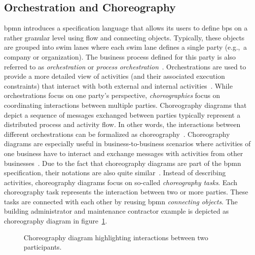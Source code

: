 \subsection{Orchestration and Choreography}
\gls{bpmn} introduces a specification language that allows its users to define \glspl{bp} on a rather granular level using flow and connecting objects. Typically, these objects are grouped into swim lanes where each swim lane defines a single party (e.g.,\ a company or organization). The business process defined for this party is also referred to as \textit{orchestration} or \textit{process orchestration}~\cite{bpmn_v2_spec}. Orchestrations are used to provide a more detailed view of activities (and their associated execution constraints) that interact with both external and internal activities~\cite{orchestration_and_choreography,weske2012_bpm_process_orchestration}. While orchestrations focus on one party's perspective, \textit{choreographies} focus on coordinating interactions between multiple parties. Choreography diagrams that depict a sequence of messages exchanged between parties typically represent a distributed process and activity flow. In other words, the interactions between different orchestrations can be formalized as choreography~\cite{trust_in_service_oriented_ds_through_blockchain,weske2012_bpm_process_choreographies}. Choreography diagrams are especially useful in business-to-business scenarios where activities of one business have to interact and exchange messages with activities from other businesses~\cite{orchestration_and_choreography}. Due to the fact that choreography diagrams are part of the \gls{bpmn} specification, their notations are also quite similar~\cite{bpmn_v2_spec}. Instead of describing activities, choreography diagrams focus on so-called \textit{choreography tasks}. Each choreography task represents the interaction between two or more parties. These tasks are connected with each other by reusing \gls{bpmn} \textit{connecting objects}. The building administrator and maintenance contractor example is depicted as choreography diagram in figure~\ref{fig:background:maintenance_full_choreography}.

\begin{figure}[h]
    \caption{Choreography diagram highlighting interactions between two participants.}
    \label{fig:background:maintenance_full_choreography}
\end{figure}

